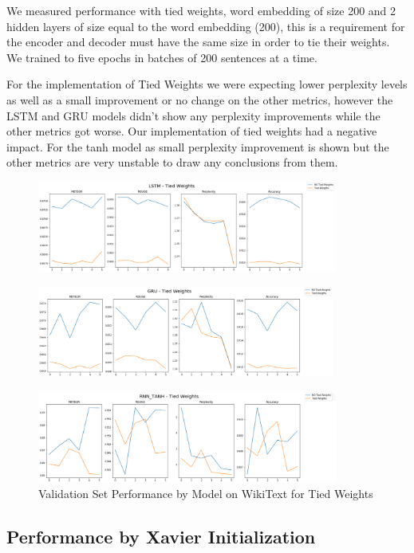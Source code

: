 \documentclass[a4paper]{article}
\begin{document}
We measured performance with tied weights, word embedding of size 200 and 2 hidden layers of size equal to the word embedding (200), this is a requirement for the encoder and decoder must have the same size in order to tie their weights. We trained to five epochs in batches of 200 sentences at a time.
 
For the implementation of Tied Weights we were expecting lower perplexity levels as well as a small improvement or no change on the other metrics, however the LSTM and GRU models didn't show any perplexity improvements while the other metrics got worse. Our implementation of tied weights had a negative impact. For the tanh model as small perplexity improvement is shown but the other metrics are very unstable to draw any conclusions from them.

\begin{figure}[!ht]
\includegraphics[width=\textwidth, height=3cm]{lstm-tw}
\centering
\end{figure}
\begin{figure}[!ht]
\includegraphics[width=\textwidth, height=3cm]{gru-tw}
\centering
\end{figure}
\begin{figure}[!ht]
\includegraphics[width=\textwidth, height=3cm]{tanh-tw}
\centering
\caption{Validation Set Performance by Model on WikiText for Tied Weights}
\end{figure}


\subsection{Performance by Xavier Initialization}
\label{sec:perf_by_xavier_init}
\end{document}
